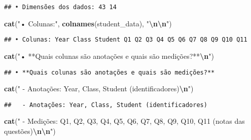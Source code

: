 \documentclass[
]{article}
\newenvironment{Shaded}{\begin{snugshade}}{\end{snugshade}}
\newcommand{\FunctionTok}[1]{\textcolor[rgb]{0.13,0.29,0.53}{\textbf{#1}}}
\newcommand{\NormalTok}[1]{#1}
\newcommand{\SpecialCharTok}[1]{\textcolor[rgb]{0.81,0.36,0.00}{\textbf{#1}}}
\newcommand{\StringTok}[1]{\textcolor[rgb]{0.31,0.60,0.02}{#1}}
\begin{document}
\begin{verbatim}
## • Dimensões dos dados: 43 14
\end{verbatim}

\begin{Shaded}
\begin{Highlighting}[]
\FunctionTok{cat}\NormalTok{(}\StringTok{"• Colunas:"}\NormalTok{, }\FunctionTok{colnames}\NormalTok{(student\_data), }\StringTok{"}\SpecialCharTok{\textbackslash{}n\textbackslash{}n}\StringTok{"}\NormalTok{)}
\end{Highlighting}
\end{Shaded}

\begin{verbatim}
## • Colunas: Year Class Student Q1 Q2 Q3 Q4 Q5 Q6 Q7 Q8 Q9 Q10 Q11
\end{verbatim}

\begin{Shaded}
\begin{Highlighting}[]
\FunctionTok{cat}\NormalTok{(}\StringTok{"• **Quais colunas são anotações e quais são medições?**}\SpecialCharTok{\textbackslash{}n}\StringTok{"}\NormalTok{)}
\end{Highlighting}
\end{Shaded}

\begin{verbatim}
## • **Quais colunas são anotações e quais são medições?**
\end{verbatim}

\begin{Shaded}
\begin{Highlighting}[]
\FunctionTok{cat}\NormalTok{(}\StringTok{"  {-} Anotações: Year, Class, Student (identificadores)}\SpecialCharTok{\textbackslash{}n}\StringTok{"}\NormalTok{)}
\end{Highlighting}
\end{Shaded}

\begin{verbatim}
##   - Anotações: Year, Class, Student (identificadores)
\end{verbatim}

\begin{Shaded}
\begin{Highlighting}[]
\FunctionTok{cat}\NormalTok{(}\StringTok{"  {-} Medições: Q1, Q2, Q3, Q4, Q5, Q6, Q7, Q8, Q9, Q10, Q11 (notas das questões)}\SpecialCharTok{\textbackslash{}n\textbackslash{}n}\StringTok{"}\NormalTok{)}
\end{Highlighting}
\end{Shaded}
\end{document}
